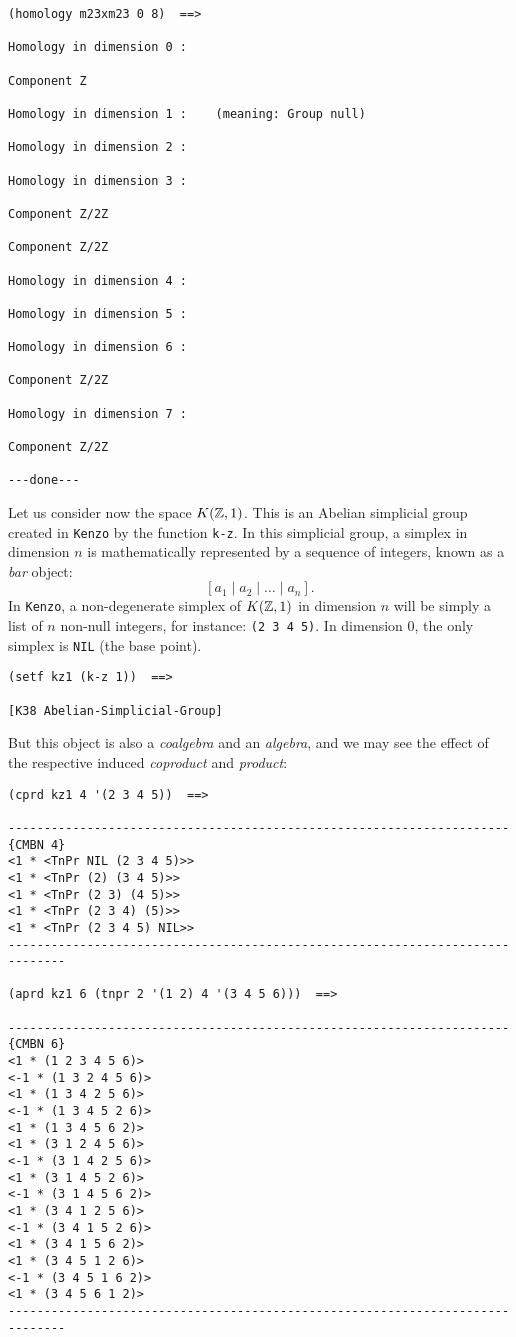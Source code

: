 {\footnotesize\begin{verbatim}
(homology m23xm23 0 8)  ==>

Homology in dimension 0 :

Component Z

Homology in dimension 1 :    (meaning: Group null)

Homology in dimension 2 :

Homology in dimension 3 :

Component Z/2Z

Component Z/2Z

Homology in dimension 4 :

Homology in dimension 5 :

Homology in dimension 6 :

Component Z/2Z

Homology in dimension 7 :

Component Z/2Z

---done---
\end{verbatim}}
\newpage
Let us consider now the space $K({\mathbb{Z}}, 1)$. This is an Abelian simplicial group created  in {\tt Kenzo}
by the function {\tt k-z}.
In this simplicial group, a  simplex  in dimension $n$
is mathematically represented by a sequence of integers, known as a {\em bar} object:
$$ [a_1 \mid a_2 \mid \ldots \mid a_n]. $$
In {\tt Kenzo}, a non-degenerate simplex of $K({\mathbb{Z}},1)$ in dimension $n$ will be simply
a list of $n$ non-null integers, for instance: {\tt (2 3 4 5)}. In dimension $0$, the only
simplex is {\tt NIL} (the base point).
{\footnotesize\begin{verbatim}
(setf kz1 (k-z 1))  ==>

[K38 Abelian-Simplicial-Group]
\end{verbatim}}
But this object is also a {\em coalgebra} and an {\em algebra}, and we may
see the effect of the respective induced {\em coproduct} and {\em product}:
{\footnotesize\begin{verbatim}
(cprd kz1 4 '(2 3 4 5))  ==>

----------------------------------------------------------------------{CMBN 4}
<1 * <TnPr NIL (2 3 4 5)>>
<1 * <TnPr (2) (3 4 5)>>
<1 * <TnPr (2 3) (4 5)>>
<1 * <TnPr (2 3 4) (5)>>
<1 * <TnPr (2 3 4 5) NIL>>
------------------------------------------------------------------------------

(aprd kz1 6 (tnpr 2 '(1 2) 4 '(3 4 5 6)))  ==>

----------------------------------------------------------------------{CMBN 6}
<1 * (1 2 3 4 5 6)>
<-1 * (1 3 2 4 5 6)>
<1 * (1 3 4 2 5 6)>
<-1 * (1 3 4 5 2 6)>
<1 * (1 3 4 5 6 2)>
<1 * (3 1 2 4 5 6)>
<-1 * (3 1 4 2 5 6)>
<1 * (3 1 4 5 2 6)>
<-1 * (3 1 4 5 6 2)>
<1 * (3 4 1 2 5 6)>
<-1 * (3 4 1 5 2 6)>
<1 * (3 4 1 5 6 2)>
<1 * (3 4 5 1 2 6)>
<-1 * (3 4 5 1 6 2)>
<1 * (3 4 5 6 1 2)>
------------------------------------------------------------------------------
\end{verbatim}}
